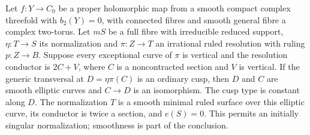 \begin{proposition}\hypertarget{tag-01BB}{}\label{cdp:st:A.5.20}

Let $f:Y\to C_0$ be a proper holomorphic map from a smooth
compact complex threefold with $b_2(Y)=0$, with connected
fibres and smooth general fibre a complex two-torus.
Let $mS$ be a full fibre with irreducible reduced support,
$\eta:T\to S$ its normalization and $\pi:Z\to T$ an
irrational ruled resolution with ruling $p:Z\to B$.
Suppose every exceptional curve of $\pi$ is vertical
and the resolution conductor is $2C+V$, where $C$
is a noncontracted section and $V$ is vertical.
If the generic transversal at $D=\eta\pi(C)$ is an
ordinary cusp, then $D$ and $C$ are smooth elliptic
curves and $C\to D$ is an isomorphism. The cusp type
is constant along $D$. The normalization $T$ is a
smooth minimal ruled surface over this elliptic curve,
its conductor is twice a section, and $e(S)=0$.
This permits an initially singular normalization;
smoothness is part of the conclusion.
\end{proposition}


